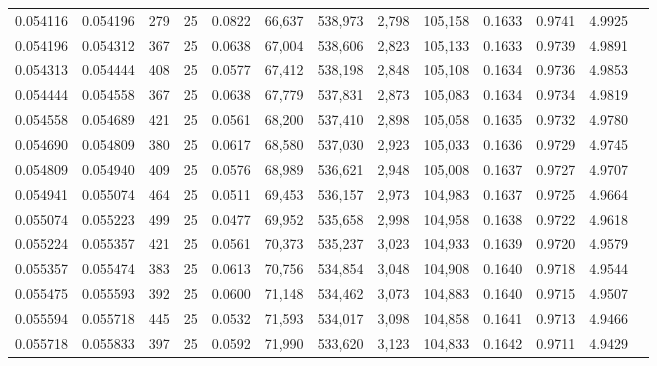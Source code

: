 \begin{tabular}{rrrrrrrrrrrrr}
0.054116 & 0.054196 &   279 &  25 &                                     0.0822 &  66,637 & 538,973 &   2,798 & 105,158 & 0.1633 & 0.9741 & 4.9925 \\
0.054196 & 0.054312 &   367 &  25 &                                     0.0638 &  67,004 & 538,606 &   2,823 & 105,133 & 0.1633 & 0.9739 & 4.9891 \\
0.054313 & 0.054444 &   408 &  25 &                                     0.0577 &  67,412 & 538,198 &   2,848 & 105,108 & 0.1634 & 0.9736 & 4.9853 \\
0.054444 & 0.054558 &   367 &  25 &                                     0.0638 &  67,779 & 537,831 &   2,873 & 105,083 & 0.1634 & 0.9734 & 4.9819 \\
0.054558 & 0.054689 &   421 &  25 &                                     0.0561 &  68,200 & 537,410 &   2,898 & 105,058 & 0.1635 & 0.9732 & 4.9780 \\
0.054690 & 0.054809 &   380 &  25 &                                     0.0617 &  68,580 & 537,030 &   2,923 & 105,033 & 0.1636 & 0.9729 & 4.9745 \\
0.054809 & 0.054940 &   409 &  25 &                                     0.0576 &  68,989 & 536,621 &   2,948 & 105,008 & 0.1637 & 0.9727 & 4.9707 \\
0.054941 & 0.055074 &   464 &  25 &                                     0.0511 &  69,453 & 536,157 &   2,973 & 104,983 & 0.1637 & 0.9725 & 4.9664 \\
0.055074 & 0.055223 &   499 &  25 &                                     0.0477 &  69,952 & 535,658 &   2,998 & 104,958 & 0.1638 & 0.9722 & 4.9618 \\
0.055224 & 0.055357 &   421 &  25 &                                     0.0561 &  70,373 & 535,237 &   3,023 & 104,933 & 0.1639 & 0.9720 & 4.9579 \\
0.055357 & 0.055474 &   383 &  25 &                                     0.0613 &  70,756 & 534,854 &   3,048 & 104,908 & 0.1640 & 0.9718 & 4.9544 \\
0.055475 & 0.055593 &   392 &  25 &                                     0.0600 &  71,148 & 534,462 &   3,073 & 104,883 & 0.1640 & 0.9715 & 4.9507 \\
0.055594 & 0.055718 &   445 &  25 &                                     0.0532 &  71,593 & 534,017 &   3,098 & 104,858 & 0.1641 & 0.9713 & 4.9466 \\
0.055718 & 0.055833 &   397 &  25 &                                     0.0592 &  71,990 & 533,620 &   3,123 & 104,833 & 0.1642 & 0.9711 & 4.9429 \\

\end{tabular}
